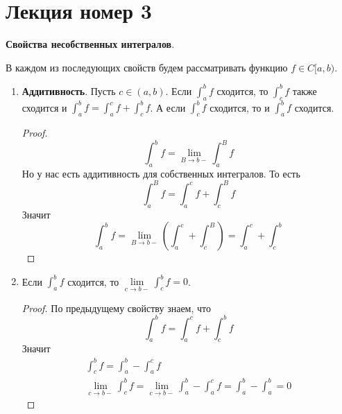 \section{Лекция номер 3}

\textbf{Свойства несобственных интегралов}.

В каждом из последующих свойств будем рассматривать функцию $f \in C[a, b)$.

\begin{enumerate}
  \item \textbf{Аддитивность}. Пусть $c \in (a, b)$. Если $\int_{a}^{b} f$ сходится, то $\int_{c}^{b} f$ также сходится и $\int_{a}^{b} f = \int_{a}^{c} f + \int_{c}^{b} f$. А если $\int_{c}^{b} f$ сходится, то и $\int_{a}^{b} f$ сходится.
  \begin{proof}
    \begin{equation*}
      \int_{a}^{b} f = \lim\limits_{B \to b-} \int_{a}^{B} f
    \end{equation*}
    Но у нас есть аддитивность для собственных интегралов. То есть
    \begin{equation*}
      \int_{a}^{B} f = \int_{a}^{c} f + \int_{c}^{B} f
    \end{equation*}
    Значит
    \begin{equation*}
      \int_{a}^{b} f = \lim\limits_{B \to b-} \left( \int_{a}^{c} + \int_{c}^{B} \right) =
      \int_{a}^{c} + \int_{c}^{b}
    \end{equation*}
  \end{proof}

  \item Если $\int_{a}^{b} f$ сходится, то $\lim\limits_{c \to b-} \int_{c}^{b} f = 0$.
  \begin{proof}
    По предыдущему свойству знаем, что
    \begin{equation*}
      \int_{a}^{b} f = \int_{a}^{c} f + \int_{c}^{b} f
    \end{equation*}
    Значит
    \begin{equation*}
      \begin{gathered}
        \int_{c}^{b} f = \int_{a}^{b} - \int_{a}^{c} f \\
        \lim\limits_{c \to b-} \int_{c}^{b} f = \lim\limits_{c \to b-} \int_{a}^{b} - \int_{a}^{c} f = \int_{a}^{b}  -\int_{a}^{b} = 0
      \end{gathered}
    \end{equation*}
  \end{proof}


\end{enumerate}
